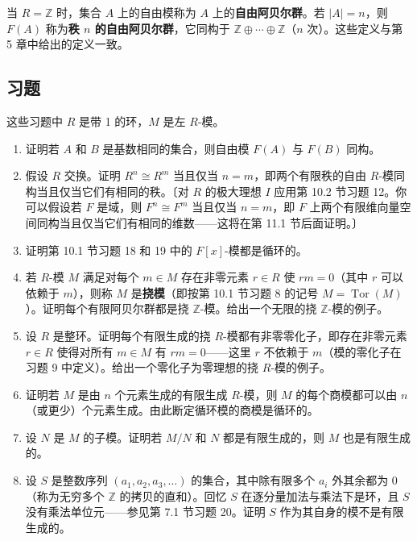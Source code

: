 当 \(R = \mathbb{Z}\) 时，集合 \(A\) 上的自由模称为 \(A\) 上的\textbf{自由阿贝尔群}。若 \(|A| = n\)，则 \(F(A)\) 称为\textbf{秩 \(n\) 的自由阿贝尔群}，它同构于 \(\mathbb{Z} \oplus \cdots \oplus \mathbb{Z}\)（\(n\) 次）。这些定义与第 5 章中给出的定义一致。

\subsection*{习题}

\noindent 这些习题中 \(R\) 是带 1 的环，\(M\) 是左 \(R\)-模。

\begin{enumerate}
\item 证明若 \(A\) 和 \(B\) 是基数相同的集合，则自由模 \(F(A)\) 与 \(F(B)\) 同构。

\item 假设 \(R\) 交换。证明 \(R^n \cong R^m\) 当且仅当 \(n = m\)，即两个有限秩的自由 \(R\)-模同构当且仅当它们有相同的秩。〔对 \(R\) 的极大理想 \(I\) 应用第 10.2 节习题 12。你可以假设若 \(F\) 是域，则 \(F^n \cong F^m\) 当且仅当 \(n = m\)，即 \(F\) 上两个有限维向量空间同构当且仅当它们有相同的维数——这将在第 11.1 节后面证明。〕

\item 证明第 10.1 节习题 18 和 19 中的 \(F[x]\)-模都是循环的。

\item 若 \(R\)-模 \(M\) 满足对每个 \(m \in M\) 存在非零元素 \(r \in R\) 使 \(rm = 0\)（其中 \(r\) 可以依赖于 \(m\)），则称 \(M\) 是\textbf{挠模}（即按第 10.1 节习题 8 的记号 \(M = \operatorname{Tor}(M)\)）。证明每个有限阿贝尔群都是挠 \(\mathbb{Z}\)-模。给出一个无限的挠 \(\mathbb{Z}\)-模的例子。

\item 设 \(R\) 是整环。证明每个有限生成的挠 \(R\)-模都有非零零化子，即存在非零元素 \(r \in R\) 使得对所有 \(m \in M\) 有 \(rm = 0\)——这里 \(r\) 不依赖于 \(m\)（模的零化子在习题 9 中定义）。给出一个零化子为零理想的挠 \(R\)-模的例子。

\item 证明若 \(M\) 是由 \(n\) 个元素生成的有限生成 \(R\)-模，则 \(M\) 的每个商模都可以由 \(n\)（或更少）个元素生成。由此断定循环模的商模是循环的。

\item 设 \(N\) 是 \(M\) 的子模。证明若 \(M/N\) 和 \(N\) 都是有限生成的，则 \(M\) 也是有限生成的。

\item 设 \(S\) 是整数序列 \((a_1, a_2, a_3, \ldots)\) 的集合，其中除有限多个 \(a_i\) 外其余都为 0（称为无穷多个 \(\mathbb{Z}\) 的拷贝的直和）。回忆 \(S\) 在逐分量加法与乘法下是环，且 \(S\) 没有乘法单位元——参见第 7.1 节习题 20。证明 \(S\) 作为其自身的模不是有限生成的。


\end{enumerate}
